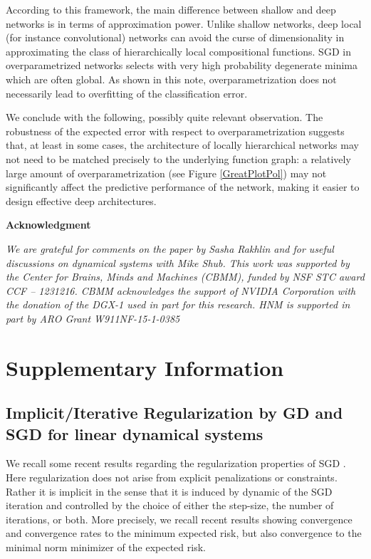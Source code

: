 \documentclass[10pt]{article}
\begin{document}
According to this framework, the main difference between shallow and deep networks
is in terms of approximation
power. Unlike shallow networks, deep local (for instance
convolutional) networks can avoid the curse of
dimensionality\cite{Theory_I} in approximating the class of
hierarchically local compositional functions. SGD in overparametrized
networks selects with very high probability degenerate minima which
are often global.  As shown in this note, overparametrization does not
necessarily lead to overfitting of the classification error.

We conclude with the following, possibly quite relevant
observation. The robustness of the expected error with respect to
overparametrization suggests that, at least in some cases, the
architecture of locally hierarchical networks may not need to be
matched precisely to the underlying function graph: a relatively large
amount of overparametrization (see Figure \ref{GreatPlotPol}) may not
significantly affect the predictive performance of the network, making
it easier to design effective deep architectures.



{\bf Acknowledgment}


{\it We are grateful for comments on the paper by Sasha Rakhlin and
  for useful discussions on dynamical systems with Mike Shub.  This
  work was supported by the Center for Brains, Minds and Machines
  (CBMM), funded by NSF STC award CCF – 1231216. CBMM 
  acknowledges the support of NVIDIA Corporation with the donation of
  the DGX-1 used in part for this research. HNM is supported in part by ARO
  Grant W911NF-15-1-0385}


%

\small

\normalsize


\newpage

\section{Supplementary Information}


\subsection{Implicit/Iterative Regularization by GD and SGD for linear
  dynamical 
systems}
\label{Lorenzo}

We recall some recent results regarding the regularization properties of SGD \cite{LinRos17}.  Here regularization does not arise from explicit penalizations or constraints. Rather it is implicit in the sense that it is induced  by dynamic of the SGD iteration and controlled by the choice of either the step-size, the number of iterations, or both.  More precisely, we recall recent results showing convergence and convergence rates to the minimum expected risk, but also  convergence  to the minimal norm minimizer of the expected risk. 
\end{document}
